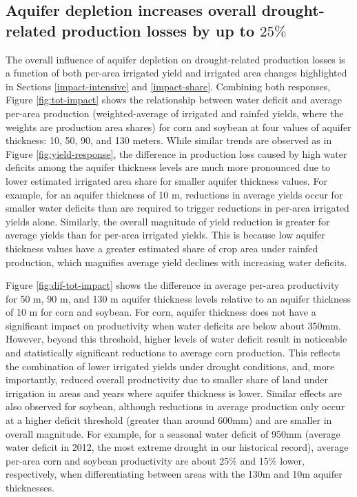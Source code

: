\documentclass[
]{article}
\begin{document}
\hypertarget{aquifer-depletion-increases-overall-drought-related-production-losses-by-up-to-25}{%
\subsection{\texorpdfstring{Aquifer depletion increases overall drought-related production losses by up to \(25\%\)}{Aquifer depletion increases overall drought-related production losses by up to 25\textbackslash\%}}\label{aquifer-depletion-increases-overall-drought-related-production-losses-by-up-to-25}}

The overall influence of aquifer depletion on drought-related production losses is a function of both per-area irrigated yield and irrigated area changes highlighted in Sections \ref{impact-intensive} and \ref{impact-share}. Combining both responses, Figure \ref{fig:tot-impact} shows the relationship between water deficit and average per-area production (weighted-average of irrigated and rainfed yields, where the weights are production area shares) for corn and soybean at four values of aquifer thickness: 10, 50, 90, and 130 meters. While similar trends are observed as in Figure \ref{fig:yield-response}, the difference in production loss caused by high water deficits among the aquifer thickness levels are much more pronounced due to lower estimated irrigated area share for smaller aquifer thickness values. For example, for an aquifer thickness of 10 m, reductions in average yields occur for smaller water deficits than are required to trigger reductions in per-area irrigated yields alone. Similarly, the overall magnitude of yield reduction is greater for average yields than for per-area irrigated yields. This is because low aquifer thickness values have a greater estimated share of crop area under rainfed production, which magnifies average yield declines with increasing water deficits.

Figure \ref{fig:dif-tot-impact} shows the difference in average per-area productivity for 50 m, 90 m, and 130 m aquifer thickness levels relative to an aquifer thickness of 10 m for corn and soybean. For corn, aquifer thickness does not have a significant impact on productivity when water deficits are below about 350mm. However, beyond this threshold, higher levels of water deficit result in noticeable and statistically significant reductions to average corn production. This reflects the combination of lower irrigated yields under drought conditions, and, more importantly, reduced overall productivity due to smaller share of land under irrigation in areas and years where aquifer thickness is lower. Similar effects are also observed for soybean, although reductions in average production only occur at a higher deficit threshold (greater than around 600mm) and are smaller in overall magnitude. For example, for a seasonal water deficit of 950mm (average water deficit in 2012, the most extreme drought in our historical record), average per-area corn and soybean productivity are about 25\% and 15\% lower, respectively, when differentiating between areas with the 130m and 10m aquifer thicknesses.
\end{document}

